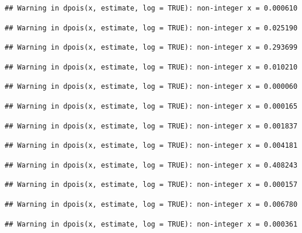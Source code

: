 \documentclass[]{article}
\begin{document}
\begin{verbatim}
## Warning in dpois(x, estimate, log = TRUE): non-integer x = 0.000610
\end{verbatim}

\begin{verbatim}
## Warning in dpois(x, estimate, log = TRUE): non-integer x = 0.025190
\end{verbatim}

\begin{verbatim}
## Warning in dpois(x, estimate, log = TRUE): non-integer x = 0.293699
\end{verbatim}

\begin{verbatim}
## Warning in dpois(x, estimate, log = TRUE): non-integer x = 0.010210
\end{verbatim}

\begin{verbatim}
## Warning in dpois(x, estimate, log = TRUE): non-integer x = 0.000060
\end{verbatim}

\begin{verbatim}
## Warning in dpois(x, estimate, log = TRUE): non-integer x = 0.000165
\end{verbatim}

\begin{verbatim}
## Warning in dpois(x, estimate, log = TRUE): non-integer x = 0.001837
\end{verbatim}

\begin{verbatim}
## Warning in dpois(x, estimate, log = TRUE): non-integer x = 0.004181
\end{verbatim}

\begin{verbatim}
## Warning in dpois(x, estimate, log = TRUE): non-integer x = 0.408243
\end{verbatim}

\begin{verbatim}
## Warning in dpois(x, estimate, log = TRUE): non-integer x = 0.000157
\end{verbatim}

\begin{verbatim}
## Warning in dpois(x, estimate, log = TRUE): non-integer x = 0.006780
\end{verbatim}

\begin{verbatim}
## Warning in dpois(x, estimate, log = TRUE): non-integer x = 0.000361
\end{verbatim}
\end{document}
